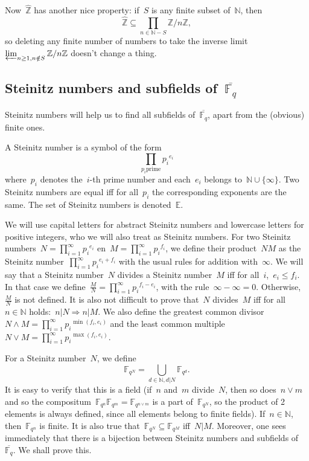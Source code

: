Now~$\widehat{\mathbb{Z}}$ has another nice property: if~$S$ is any finite subset of~$\mathbb{N}$, then
\begin{equation}
  \widehat{\mathbb{Z}} \subseteq \prod_{n \in \mathbb{N}-S} \mathbb{Z}/n\mathbb{Z}, 
\end{equation}
so deleting any finite number of numbers to take the inverse limit~$\varprojlim_{n \geq 1, n \notin S} \mathbb{Z}/n\mathbb{Z}$ doesn't change a thing.

\subsection{Steinitz numbers and subfields of~$\overline{\mathbb{F}_q}$}
Steinitz numbers will help us to find all subfields of~$\overline{\mathbb{F}_q}$, apart from the (obvious) finite ones.

\begin{definition}
  A Steinitz number is a symbol of the form
  \begin{equation}
    \prod_{p_i \text{prime}}{p_i}^{e_{i}}
  \end{equation}
  where~$p_{i}$ denotes the~$i$-th prime number and each~$e_i$ belongs to~$\mathbb{N} \cup \{\infty\}$. Two Steinitz numbers are equal iff for all~$p_i$ the corresponding exponents are the same. The set of Steinitz numbers is denoted~$\mathbb{E}$.
\end{definition}

We will use capital letters for abstract Steinitz numbers and lowercase letters for positive integers, who we will also treat as Steinitz numbers. For two Steinitz numbers~$N=\prod_{i=1}^\infty {p_i}^{e_{i}}$ en~$M=\prod_{i=1}^\infty {p_i}^{f_{i}}$, we define their product~$NM$ as the Steinitz number~$\prod_{i=1}^\infty {p_i}^{e_{i}+f_{i}}$ with the usual rules for addition with~$\infty$. We will say that a Steinitz number~$N$ divides a Steinitz number~$M$ iff for all~$i$,~$e_i \leq f_i$. In that case we define~$\frac{M}{N} = \prod_{i=1}^\infty {p_i}^{f_{i}-e_{i}}$, with the rule~$\infty - \infty = 0$. Otherwise,~$\frac{M}{N} $ is not defined. It is also not difficult to prove that~$N$ divides~$M$ iff for all~$n \in \mathbb{N}$ holds:~$n|N \Rightarrow n|M$. We also define the greatest common divisor~$N \wedge M= \prod_{i=1}^\infty {p_i}^{\min(f_{i},e_{i})}$ and the least common multiple~$N \vee M = \prod_{i=1}^\infty {p_i}^{\max(f_{i},e_{i})}$.

For a Steinitz number~$N$, we define~$$\mathbb{F}_{q^N} = \bigcup_{d \in \mathbb{N},d|N} \mathbb{F}_{q^d}.$$ It is easy to verify that this is a field (if~$n$ and~$m$ divide~$N$, then so does~$n \vee m$ and so the compositum~$\mathbb{F}_{q^n}\mathbb{F}_{q^m} = \mathbb{F}_{q^{n\vee m}}$ is a part of~$\mathbb{F}_{q^N}$, so the product of 2 elements is always defined, since all elements belong to finite fields). If~$n \in \mathbb{N}$, then~$\mathbb{F}_{q^n}$ is finite. It is also true that~$\mathbb{F}_{q^N} \subseteq \mathbb{F}_{q^M}$ iff~$N|M$. Moreover, one sees immediately that there is a bijection between Steinitz numbers and subfields of~$\overline{\mathbb{F}_{q}}$. We shall prove this.

